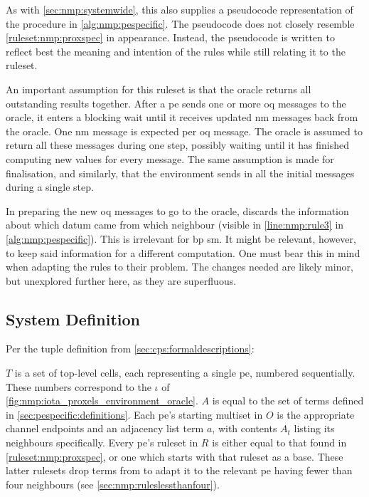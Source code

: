 As with \cref{sec:nmp:systemwide}, this  also supplies a pseudocode representation of the procedure in \cref{alg:nmp:pespecific}.  The pseudocode does not closely resemble \cref{ruleset:nmp:proxspec} in appearance.  Instead, the pseudocode is written to reflect best the meaning and intention of the rules while still relating it to the \gls{ruleset}.

An important assumption for this \gls{ruleset} is that the oracle returns all outstanding results together.  After a \gls{pe} sends one or more \gls{oq} messages to the oracle, it enters a blocking wait until it receives updated \gls{nm} messages back from the oracle.  One \gls{nm} message is expected per \gls{oq} message.  The oracle is assumed to return all these messages during one step, possibly waiting until it has finished computing new values for every message.  The same assumption is made for finalisation, and similarly, that the environment sends in all the initial messages during a single step.

In preparing the new \gls{oq} messages to go to the oracle,  discards the information about which datum came from which neighbour (visible in \cref{line:nmp:rule3} in \cref{alg:nmp:pespecific}).  This is irrelevant for \gls{bp} \gls{sm}.  It might be relevant, however, to keep said information for a different computation.  One must bear this in mind when adapting the rules to their problem.  The changes needed are likely minor, but unexplored further here, as they are superfluous.

\subsection{System Definition}
Per the tuple definition from \cref{sec:cps:formaldescriptions}:


\(T\) is a set of top-level cells, each representing a single \gls{pe}, numbered sequentially.  These numbers correspond to the \(\iota\) of \cref{fig:nmp:iota_proxels_environment_oracle}.  \(A\) is equal to the set of terms defined in \cref{sec:pespecific:definitions}.  Each \gls{pe}'s starting multiset in \(O\) is the appropriate channel endpoints and an adjacency list term \(a\), with contents \(A_t\) listing its neighbours specifically.  Every \gls{pe}'s \gls{ruleset} in \(R\) is either equal to that found in \cref{ruleset:nmp:proxspec}, or one which starts with that \gls{ruleset} as a base.  These latter \glspl{ruleset} drop terms from  to adapt it to the relevant \gls{pe} having fewer than four neighbours (see \cref{sec:nmp:ruleslessthanfour}).

